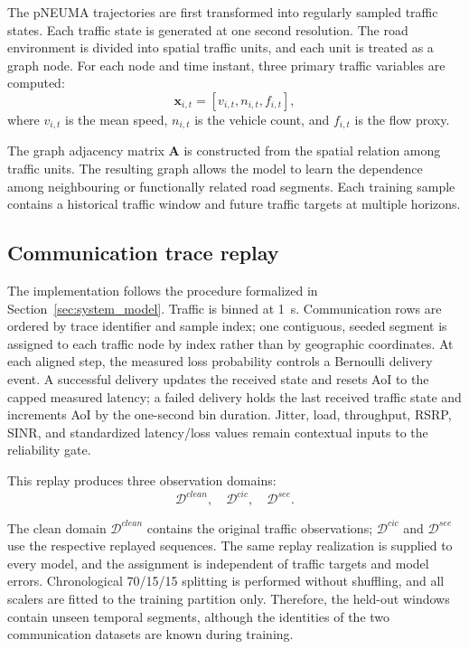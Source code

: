 \documentclass[pdflatex,sn-mathphys-num]{sn-jnl}%
\newenvironment{changed}{}{}
\theoremstyle{thmstyleone}%
\theoremstyle{thmstyletwo}%
\theoremstyle{thmstylethree}%
\begin{document}
The pNEUMA trajectories are first transformed into regularly sampled traffic states. Each traffic state is generated at one second resolution. The road environment is divided into spatial traffic units, and each unit is treated as a graph node. For each node and time instant, three primary traffic variables are computed:
\begin{equation}
    \mathbf{x}_{i,t}
    =
    \left[
    v_{i,t},
    n_{i,t},
    f_{i,t}
    \right],
\end{equation}
where \(v_{i,t}\) is the mean speed, \(n_{i,t}\) is the vehicle count, and \(f_{i,t}\) is the flow proxy.

The graph adjacency matrix \(\mathbf{A}\) is constructed from the spatial relation among traffic units. The resulting graph allows the model to learn the dependence among neighbouring or functionally related road segments. Each training sample contains a historical traffic window and future traffic targets at multiple horizons.

\subsection{Communication trace replay}
\label{subsec:communication_trace_replay}

\begin{changed}
The implementation follows the procedure formalized in Section~\ref{sec:system_model}. Traffic is binned at 1~s. Communication rows are ordered by trace identifier and sample index; one contiguous, seeded segment is assigned to each traffic node by index rather than by geographic coordinates. At each aligned step, the measured loss probability controls a Bernoulli delivery event. A successful delivery updates the received state and resets AoI to the capped measured latency; a failed delivery holds the last received traffic state and increments AoI by the one-second bin duration. Jitter, load, throughput, RSRP, SINR, and standardized latency/loss values remain contextual inputs to the reliability gate.

This replay produces three observation domains:
\begin{equation}
    \mathcal{D}^{clean},
    \quad
    \mathcal{D}^{cic},
    \quad
    \mathcal{D}^{see}.
\end{equation}

The clean domain \(\mathcal{D}^{clean}\) contains the original traffic observations; \(\mathcal{D}^{cic}\) and \(\mathcal{D}^{see}\) use the respective replayed sequences. The same replay realization is supplied to every model, and the assignment is independent of traffic targets and model errors. Chronological 70/15/15 splitting is performed without shuffling, and all scalers are fitted to the training partition only. Therefore, the held-out windows contain unseen temporal segments, although the identities of the two communication datasets are known during training.
\end{changed}
\end{document}
